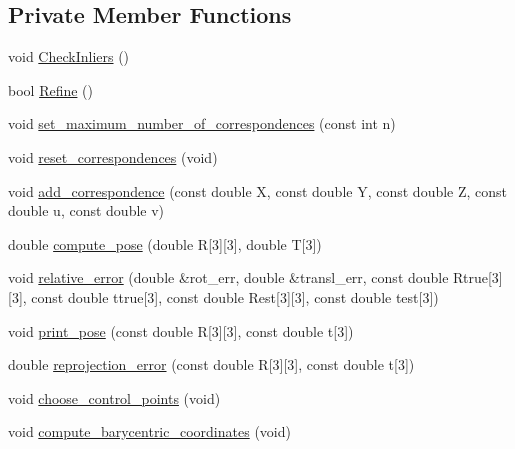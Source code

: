 \subsection*{Private Member Functions}
\begin{DoxyCompactItemize}
\item 
void \mbox{\hyperlink{class_o_r_b___s_l_a_m2_1_1_pn_psolver_abb27b1402d63ce78890d3f1ea42a75a4}{Check\+Inliers}} ()
\item 
bool \mbox{\hyperlink{class_o_r_b___s_l_a_m2_1_1_pn_psolver_a19710728d61dcf1caa32f31d140f3327}{Refine}} ()
\item 
void \mbox{\hyperlink{class_o_r_b___s_l_a_m2_1_1_pn_psolver_aa2747be485a2a87ad5a72f8431edbf77}{set\+\_\+maximum\+\_\+number\+\_\+of\+\_\+correspondences}} (const int n)
\item 
void \mbox{\hyperlink{class_o_r_b___s_l_a_m2_1_1_pn_psolver_a78dcd4d88b5ebae795d8c214932c4089}{reset\+\_\+correspondences}} (void)
\item 
void \mbox{\hyperlink{class_o_r_b___s_l_a_m2_1_1_pn_psolver_acfff5312c244e3e6de7bc16b3a72f34b}{add\+\_\+correspondence}} (const double X, const double Y, const double Z, const double u, const double v)
\item 
double \mbox{\hyperlink{class_o_r_b___s_l_a_m2_1_1_pn_psolver_aa712661f5888f9e1f580fe7f0117e389}{compute\+\_\+pose}} (double R\mbox{[}3\mbox{]}\mbox{[}3\mbox{]}, double T\mbox{[}3\mbox{]})
\item 
void \mbox{\hyperlink{class_o_r_b___s_l_a_m2_1_1_pn_psolver_ab3247415c8c4ff0a5df74096907eac10}{relative\+\_\+error}} (double \&rot\+\_\+err, double \&transl\+\_\+err, const double Rtrue\mbox{[}3\mbox{]}\mbox{[}3\mbox{]}, const double ttrue\mbox{[}3\mbox{]}, const double Rest\mbox{[}3\mbox{]}\mbox{[}3\mbox{]}, const double test\mbox{[}3\mbox{]})
\item 
void \mbox{\hyperlink{class_o_r_b___s_l_a_m2_1_1_pn_psolver_a2be5e2c8a40397fb9a7c7457be95c407}{print\+\_\+pose}} (const double R\mbox{[}3\mbox{]}\mbox{[}3\mbox{]}, const double t\mbox{[}3\mbox{]})
\item 
double \mbox{\hyperlink{class_o_r_b___s_l_a_m2_1_1_pn_psolver_a8d0ecb37dd35686ae16ff2cdb277cd82}{reprojection\+\_\+error}} (const double R\mbox{[}3\mbox{]}\mbox{[}3\mbox{]}, const double t\mbox{[}3\mbox{]})
\item 
void \mbox{\hyperlink{class_o_r_b___s_l_a_m2_1_1_pn_psolver_a42c51e43d16d52747facbaca93fcd583}{choose\+\_\+control\+\_\+points}} (void)
\item 
void \mbox{\hyperlink{class_o_r_b___s_l_a_m2_1_1_pn_psolver_a1e35c1813d1a76d6b2a1664ac7080dcd}{compute\+\_\+barycentric\+\_\+coordinates}} (void)

\end{DoxyCompactItemize}

